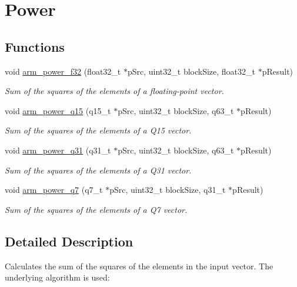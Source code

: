 \hypertarget{group__power}{}\section{Power}
\label{group__power}
\subsection*{Functions}
\begin{DoxyCompactItemize}
\item 
void \hyperlink{group__power_ga993c00dd7f661d66bdb6e58426e893aa}{arm\+\_\+power\+\_\+f32} (float32\+\_\+t $\ast$p\+Src, uint32\+\_\+t block\+Size, float32\+\_\+t $\ast$p\+Result)
\begin{DoxyCompactList}\small\item\em Sum of the squares of the elements of a floating-\/point vector. \end{DoxyCompactList}\item 
void \hyperlink{group__power_ga7050c04b7515e01a75c38f1abbaf71ba}{arm\+\_\+power\+\_\+q15} (q15\+\_\+t $\ast$p\+Src, uint32\+\_\+t block\+Size, q63\+\_\+t $\ast$p\+Result)
\begin{DoxyCompactList}\small\item\em Sum of the squares of the elements of a Q15 vector. \end{DoxyCompactList}\item 
void \hyperlink{group__power_ga0b93d31bb5b5ed214c2b94d8a7744cd2}{arm\+\_\+power\+\_\+q31} (q31\+\_\+t $\ast$p\+Src, uint32\+\_\+t block\+Size, q63\+\_\+t $\ast$p\+Result)
\begin{DoxyCompactList}\small\item\em Sum of the squares of the elements of a Q31 vector. \end{DoxyCompactList}\item 
void \hyperlink{group__power_gaf969c85c5655e3d72d7b99ff188f92c9}{arm\+\_\+power\+\_\+q7} (q7\+\_\+t $\ast$p\+Src, uint32\+\_\+t block\+Size, q31\+\_\+t $\ast$p\+Result)
\begin{DoxyCompactList}\small\item\em Sum of the squares of the elements of a Q7 vector. \end{DoxyCompactList}\end{DoxyCompactItemize}


\subsection{Detailed Description}
Calculates the sum of the squares of the elements in the input vector. The underlying algorithm is used\+:


